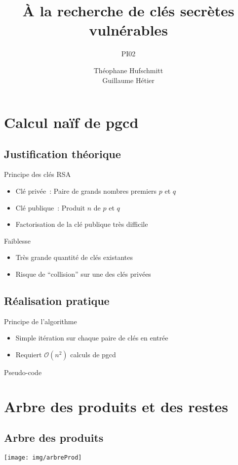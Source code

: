 \documentclass{beamer}
\title{À la recherche de clés secrètes vulnérables}
\subtitle{PI02}
\date{}
\author{Théophane Hufschmitt\\Guillaume Hétier}
\begin{document}
\beamerdefaultoverlayspecification{<+->}
\begin{frame}
  \maketitle
\end{frame}

\section{Calcul naïf de pgcd}
\subsection{Justification théorique}
\begin{frame}
  \begin{block}{Principe des clés RSA}
    \begin{itemize}
      \item Clé privée~: Paire de grands nombres premiers $p$ et $q$
      \item Clé publique~: Produit $n$ de $p$ et $q$
      \item Factorisation de la clé publique très difficile
    \end{itemize}
  \end{block}
  \begin{block}{Faiblesse}
    \begin{itemize}
      \item Très grande quantité de clés existantes
      \item Risque de ``collision'' sur une des clés privées
    \end{itemize}
  \end{block}
\end{frame}
\subsection{Réalisation pratique}
\begin{frame}
  \begin{block}{Principe de l'algorithme}
    \begin{itemize}
      \item Simple itération sur chaque paire de clés en entrée
      \item Requiert $\mathcal{O}(n^2)$ calculs de pgcd
    \end{itemize}
  \end{block}  
  \begin{block}{Pseudo-code}
    \begin{algorithm}[H]
    \end{algorithm}
  \end{block}
\end{frame}
\section{Arbre des produits et des restes}
\subsection{Arbre des produits}
\begin{frame}
  \texttt{[image: img/arbreProd]}  
\end{frame}
\end{document}
